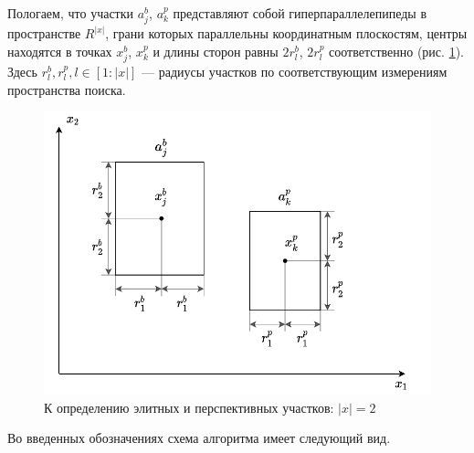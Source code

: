 Пологаем, что участки $a_j^b$, $a_k^p$ представляют собой гиперпараллелепипеды в пространстве $R^{|x|}$, грани которых параллельны координатным плоскостям, центры находятся в точках $x_j^b$, $x_k^p$ и длины сторон равны $2r_l^b$, $2r_l^p$ соответственно (рис. \ref{fig:bee2}). Здесь $r_l^b, r_l^p, l \in [1:|x|]$ --- радиусы участков по соответствующим измерениям пространства поиска.  


\begin{figure}[h!]
	\begin{center}
	\includegraphics[pages=-]{./inc/img/bee2.pdf}
	\caption{К определению элитных и перспективных участков: $|x| = 2$}  
	\label{fig:bee2}
\end{center}
\end{figure}  


Во введенных обозначениях схема алгоритма имеет следующий вид.

